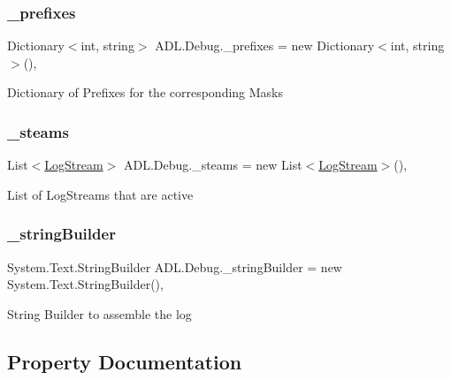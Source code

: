 \subsubsection{\texorpdfstring{\+\_\+prefixes}{\_prefixes}}
{\footnotesize\ttfamily Dictionary$<$int, string$>$ A\+D\+L.\+Debug.\+\_\+prefixes = new Dictionary$<$int, string$>$()\hspace{0.3cm}{\ttfamily [static]}, {\ttfamily [private]}}



Dictionary of Prefixes for the corresponding Masks 

\mbox{\label{class_a_d_l_1_1_debug_a5d5f16baa54da2aef4115a02a7253d40}} 
\subsubsection{\texorpdfstring{\+\_\+steams}{\_steams}}
{\footnotesize\ttfamily List$<$\mbox{\hyperlink{class_a_d_l_1_1_log_stream}{Log\+Stream}}$>$ A\+D\+L.\+Debug.\+\_\+steams = new List$<$\mbox{\hyperlink{class_a_d_l_1_1_log_stream}{Log\+Stream}}$>$()\hspace{0.3cm}{\ttfamily [static]}, {\ttfamily [private]}}



List of Log\+Streams that are active 

\mbox{\label{class_a_d_l_1_1_debug_a8f063e98d96cd91379b5f63969124877}} 
\subsubsection{\texorpdfstring{\+\_\+string\+Builder}{\_stringBuilder}}
{\footnotesize\ttfamily System.\+Text.\+String\+Builder A\+D\+L.\+Debug.\+\_\+string\+Builder = new System.\+Text.\+String\+Builder()\hspace{0.3cm}{\ttfamily [static]}, {\ttfamily [private]}}



String Builder to assemble the log 



\subsection{Property Documentation}
\mbox{\label{class_a_d_l_1_1_debug_a5a63093ff8ac05237224edcce57396c4}} 
